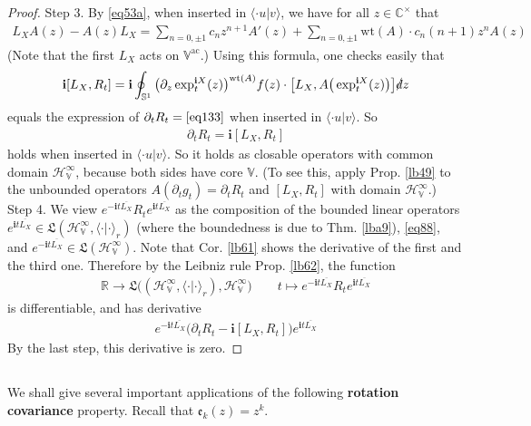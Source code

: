 \documentclass[12pt,b5paper,notitlepage]{article}
\theoremstyle{definition}
\theoremstyle{plain}
\newcommand{\fk}{\mathfrak}
\newcommand{\ovl}{\overline}
\newcommand{\bk}[1]{\langle {#1}\rangle}
\newcommand{\im}{\mathbf{i}}
\newcommand{\Vbb}{\mathbb V}
\newcommand{\Cbb}{\mathbb C}
\newcommand{\Rbb}{\mathbb R}
\newcommand{\wt}{\mathrm{wt}}
\newcommand{\Sbb}{{\mathbb S}}
\newcommand{\HV}{\mathcal H_{\mathbb V}}
\newcommand{\ek}{\mathfrak{e}}
\newcommand{\ointn}{\oint\nolimits}
\newcommand{\sd}{\slashed{d}}
\newcommand{\ac}{\mathrm{ac}}
\numberwithin{equation}{section}
\begin{document}
\begin{proof}
Step 3. By \eqref{eq53a}, when inserted in $\bk{\cdot u|v}$, we have for all $z\in\Cbb^\times$ that
\begin{align*}
L_XA(z)-A(z)L_X=\sum_{n=0,\pm1}c_nz^{n+1}A'(z)+\sum_{n=0,\pm1}\wt(A)\cdot c_n(n+1)z^nA(z)
\end{align*}
(Note that the first $L_X$ acts on $\Vbb^\ac$.) Using this formula, one checks easily that
\begin{align*}
\im[L_X,R_t]=\im\ointn_{\Sbb^1} \big(\partial_z\exp^{\im X}_t(z)\big)^{\wt(A)}f(z)\cdot \big[L_X,A\big(\exp^{\im X}_t(z)\big)\big]\sd z
\end{align*}
equals the expression of $\partial_tR_t=\eqref{eq133}$ when inserted in $\bk{\cdot u|v}$. So
\begin{align*}
\partial_tR_t=\im [L_X,R_t]
\end{align*}
holds when inserted in $\bk{\cdot u|v}$. So it holds as closable operators with common domain $\HV^\infty$, because both sides have core $\Vbb$. (To see this, apply Prop. \ref{lb49} to the unbounded operators $A(\partial_tg_t)=\partial_t R_t$ and $[L_X,R_t]$ with domain $\HV^\infty$.)\\[-1ex]

Step 4. We view $e^{-\im t\ovl{L_X}} R_te^{\im t\ovl{L_X}}$ as the composition of the bounded linear operators $e^{\im t\ovl{L_X}}\in\fk L(\HV^\infty,\bk{\cdot|\cdot}_r)$ (where the boundedness is due to Thm. \ref{lba9}), \eqref{eq88}, and $e^{-\im t\ovl{L_X}}\in\fk L(\HV^\infty)$. Note that Cor. \ref{lb61} shows the derivative of the first and the third one. Therefore by the Leibniz rule Prop. \ref{lb62}, the function
\begin{align*}
\Rbb\rightarrow\fk L\big((\HV^\infty,\bk{\cdot|\cdot}_r),\HV^\infty\big) \qquad t\mapsto e^{-\im t\ovl{L_X}}R_te^{\im t\ovl{L_X}}
\end{align*}
is differentiable, and has derivative
\begin{align*}
e^{-\im t\ovl{L_X}}\big(\partial_tR_t-\im [L_X,R_t] \big)e^{\im t\ovl{L_X}}
\end{align*}
By the last step, this derivative is zero. 
\end{proof}




\subsection{}


We shall give several important applications of the following \textbf{rotation covariance} property. Recall that $\ek_k(z)=z^k$.
\end{document}
